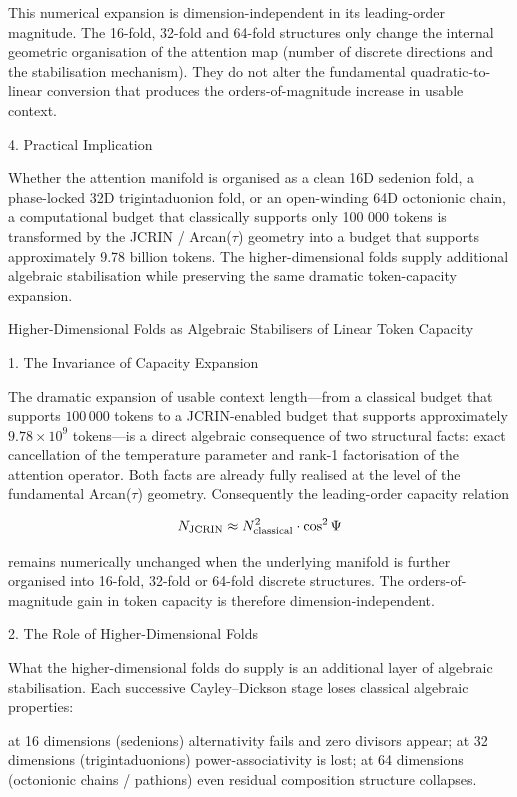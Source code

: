 This numerical expansion is dimension-independent in its leading-order magnitude. The 16-fold, 32-fold and 64-fold structures only change the internal geometric organisation of the attention map (number of discrete directions and the stabilisation mechanism). They do not alter the fundamental quadratic-to-linear conversion that produces the orders-of-magnitude increase in usable context.

4. Practical Implication

Whether the attention manifold is organised as a clean 16D sedenion fold, a phase-locked 32D trigintaduonion fold, or an open-winding 64D octonionic chain, a computational budget that classically supports only 100 000 tokens is transformed by the JCRIN / Arcan(\(\tau\)) geometry into a budget that supports approximately 9.78 billion tokens. The higher-dimensional folds supply additional algebraic stabilisation while preserving the same dramatic token-capacity expansion.
  
Higher-Dimensional Folds as Algebraic Stabilisers of Linear Token Capacity

1. The Invariance of Capacity Expansion

The dramatic expansion of usable context length—from a classical budget that supports \(100\,000\) tokens to a JCRIN-enabled budget that supports approximately \(9.78 \times 10^{9}\) tokens—is a direct algebraic consequence of two structural facts: exact cancellation of the temperature parameter and rank-1 factorisation of the attention operator. Both facts are already fully realised at the level of the fundamental Arcan(\(\tau\)) geometry. Consequently the leading-order capacity relation

\[
N_{\rm JCRIN} \approx N_{\rm classical}^{2}\cdot\cos^{2}\Psi
\]

remains numerically unchanged when the underlying manifold is further organised into 16-fold, 32-fold or 64-fold discrete structures. The orders-of-magnitude gain in token capacity is therefore dimension-independent.

2. The Role of Higher-Dimensional Folds

What the higher-dimensional folds do supply is an additional layer of algebraic stabilisation. Each successive Cayley–Dickson stage loses classical algebraic properties:

at 16 dimensions (sedenions) alternativity fails and zero divisors appear;
at 32 dimensions (trigintaduonions) power-associativity is lost;
at 64 dimensions (octonionic chains / pathions) even residual composition structure collapses.

